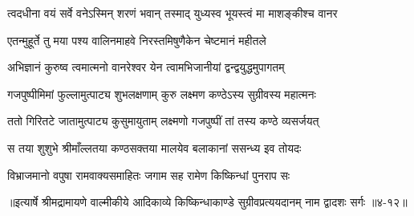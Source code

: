 \twolineshloka
{त्वदधीना वयं सर्वे वनेऽस्मिन् शरणं भवान्}
{तस्माद् युध्यस्व भूयस्त्वं मा माशङ्कीश्च वानर} %

\twolineshloka
{एतन्मुहूर्ते तु मया पश्य वालिनमाहवे}
{निरस्तमिषुणैकेन चेष्टमानं महीतले} %

\twolineshloka
{अभिज्ञानं कुरुष्व त्वमात्मनो वानरेश्वर}
{येन त्वामभिजानीयां द्वन्द्वयुद्धमुपागतम्} %

\twolineshloka
{गजपुष्पीमिमां फुल्लामुत्पाट्य शुभलक्षणाम्}
{कुरु लक्ष्मण कण्ठेऽस्य सुग्रीवस्य महात्मनः} %

\twolineshloka
{ततो गिरितटे जातामुत्पाट्य कुसुमायुताम्}
{लक्ष्मणो गजपुष्पीं तां तस्य कण्ठे व्यसर्जयत्} %

\twolineshloka
{स तया शुशुभे श्रीमाँल्लतया कण्ठसक्तया}
{मालयेव बलाकानां ससन्ध्य इव तोयदः} %

\twolineshloka
{विभ्राजमानो वपुषा रामवाक्यसमाहितः}
{जगाम सह रामेण किष्किन्धां पुनराप सः} %


॥इत्यार्षे श्रीमद्रामायणे वाल्मीकीये आदिकाव्ये किष्किन्धाकाण्डे सुग्रीवप्रत्ययदानम् नाम द्वादशः सर्गः ॥४-१२॥
